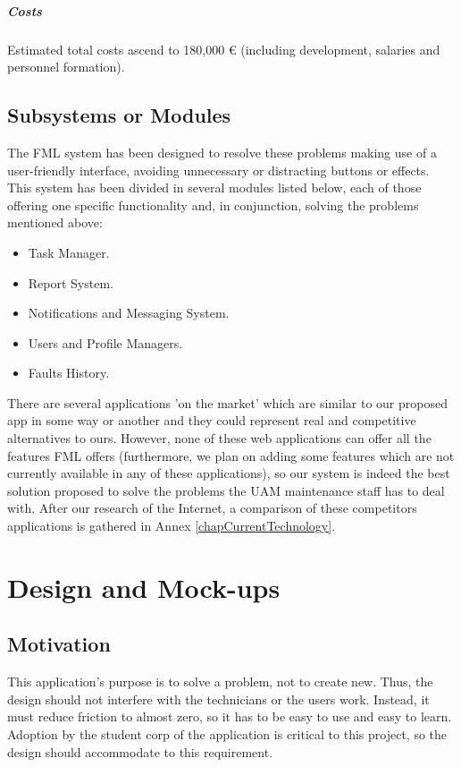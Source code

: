 \documentclass{report}
\begin{document}
\paragraph{Costs} Estimated total costs ascend to 180,000 \euro{} (including development, salaries and personnel formation).

\section{Subsystems or Modules}

The FML system has been designed to resolve these problems making use of a user-friendly interface, avoiding unnecessary or distracting buttons or effects. This system has been divided in several modules listed below, each of those offering one specific functionality and, in conjunction, solving the problems mentioned above:
\begin{itemize}
\item Task Manager.
\item Report System.
\item Notifications and Messaging System.
\item Users and Profile Managers.
\item Faults History.
\end{itemize}

There are several applications 'on the market' which are similar to our proposed app in some way or another and they could represent real and competitive alternatives to ours. However, none of these web applications can offer all the features FML offers (furthermore, we plan on adding some features which are not currently available in any of these applications), so our system is indeed the best solution proposed to solve the problems the UAM maintenance staff has to deal with. After our research of the Internet, a comparison of these competitors applications is gathered in Annex \ref{chapCurrentTechnology}.




\chapter{Design and Mock-ups}
\label{chapDesign}

\section{Motivation}

This application's purpose is to solve a problem, not to create new. Thus, the design should not interfere with the technicians or the users work. Instead, it must reduce friction to almost zero, so it has to be easy to use and easy to learn. Adoption by the student corp of the application is critical to this project, so the design should accommodate to this requirement.
\end{document}
